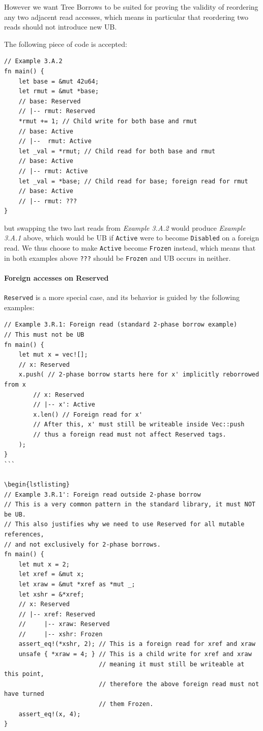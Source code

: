 \documentclass[a4paper,11pt]{article}
\theoremstyle{plain}
\theoremstyle{definition}
\theoremstyle{remark}
\newcommand{\tperm}[1]{\texttt{#1}}
\begin{document}
However we want Tree Borrows to be suited for proving the validity of reordering
any two adjacent read accesses, which means in particular that reordering two
reads should not introduce new UB.

The following piece of code is accepted:
\begin{lstlisting}
// Example 3.A.2
fn main() {
    let base = &mut 42u64;
    let rmut = &mut *base;
    // base: Reserved
    // |-- rmut: Reserved
    *rmut += 1; // Child write for both base and rmut
    // base: Active
    // |--  rmut: Active
    let _val = *rmut; // Child read for both base and rmut
    // base: Active
    // |-- rmut: Active
    let _val = *base; // Child read for base; foreign read for rmut
    // base: Active
    // |-- rmut: ???
}
\end{lstlisting}
but swapping the two last reads from \textit{Example 3.A.2} would produce \textit{Example 3.A.1} above,
which would be UB if \tperm{Active} were to become \tperm{Disabled} on a foreign read.
We thus choose to make \tperm{Active} become \tperm{Frozen} instead, which means that in
both examples above \tperm{???} should be \tperm{Frozen} and UB occurs in neither.

\paragraph*{Foreign accesses on Reserved}

\tperm{Reserved} is a more special case, and its behavior is guided by the following examples:
\begin{lstlisting}
// Example 3.R.1: Foreign read (standard 2-phase borrow example)
// This must not be UB
fn main() {
    let mut x = vec![];
    // x: Reserved
    x.push( // 2-phase borrow starts here for x' implicitly reborrowed from x
        // x: Reserved
        // |-- x': Active
        x.len() // Foreign read for x'
        // After this, x' must still be writeable inside Vec::push
        // thus a foreign read must not affect Reserved tags.
    );
}
```

\begin{lstlisting}
// Example 3.R.1': Foreign read outside 2-phase borrow
// This is a very common pattern in the standard library, it must NOT be UB.
// This also justifies why we need to use Reserved for all mutable references,
// and not exclusively for 2-phase borrows.
fn main() {
    let mut x = 2;
    let xref = &mut x;
    let xraw = &mut *xref as *mut _;
    let xshr = &*xref;
    // x: Reserved
    // |-- xref: Reserved
    //     |-- xraw: Reserved
    //     |-- xshr: Frozen
    assert_eq!(*xshr, 2); // This is a foreign read for xref and xraw
    unsafe { *xraw = 4; } // This is a child write for xref and xraw
                          // meaning it must still be writeable at this point,
                          // therefore the above foreign read must not have turned
                          // them Frozen.
    assert_eq!(x, 4);
}
\end{lstlisting}
\end{document}
